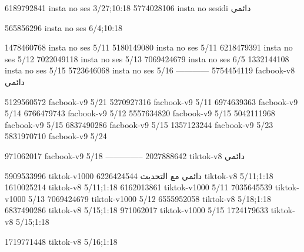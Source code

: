 
6189792841 insta no ses
3/27;10:18
5774028106 insta no sesidi
دائمي


565856296 insta no ses
6/4;10:18


1478460768 insta no ses
5/11
5180149080 insta no ses
5/11
6218479391 insta no ses
5/12
7022049118 insta no ses
5/13
7069424679 insta no ses
6/5
1332144108 insta no ses
5/15
5723646068 insta no ses
5/16
------------
5754454119 facbook-v8
دائمي

5129560572 facbook-v9
5/21
5270927316 facbook-v9
5/11
6974639363 facbook-v9
5/14
6766479743 facbook-v9
5/12
5557634820 facbook-v9
5/15
5042111968 facbook-v9
5/15
6837490286 facbook-v9
5/15
1357123244 facbook-v9
5/23
5831970710 facbook-v9
5/24

971062017 facbook-v9
5/18
--------------
2027888642 tiktok-v8
دائمي

5909533996 tiktok-v1000
دائمي مع التحديث
6226424544 tiktok-v8
5/11;1:18
1610025214 tiktok-v8
5/11;1:18
6162013861 tiktok-v1000
5/11
7035645539 tiktok-v1000
5/13
7069424679 tiktok-v1000
5/12
6555952058 tiktok-v8
5/18;1:18
6837490286 tiktok-v8
5/15;1:18
971062017 tiktok-v1000
5/15
1724179633 tiktok-v8
5/15;1:18

1719771448 tiktok-v8
5/16;1:18
